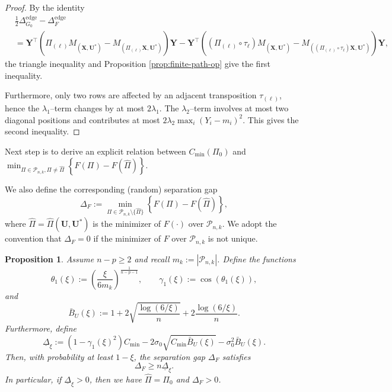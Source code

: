 \documentclass[11pt, reqno]{amsart}
\renewcommand{\hat}{\widehat}
\renewcommand{\ge}{\geqslant}
\newcommand{\mP}{\mathcal{P}}
\newcommand{\1}{\mbox{1}\hspace{-0.25em}\mbox{l}}
\theoremstyle{definition}\newtheorem{problem}{Problem}[section]
\theoremstyle{definition}\newtheorem{definition}[problem]{Definition}
\theoremstyle{remark}\newtheorem{assumption}{Assumption}
\theoremstyle{remark}\newtheorem{remark}[problem]{Remark}
\theoremstyle{definition}\newtheorem{example}[problem]{Example}
\theoremstyle{plain}\newtheorem{theorem}[problem]{Theorem}
\theoremstyle{plain}\newtheorem{question}[problem]{Question}
\theoremstyle{plain}\newtheorem{lemma}[problem]{Lemma}
\theoremstyle{plain}\newtheorem{proposition}[problem]{Proposition}
\theoremstyle{plain}\newtheorem{corollary}[problem]{Corollary}
\theoremstyle{plain}\newtheorem{conjecture}[problem]{Conjecture}
\begin{document}
\begin{proof}
By the identity
\begin{align}    
&\frac{1}{2}\Delta_{G_0}^{\mathrm{edge}}-\Delta_F^{\mathrm{edge}}\\
&=\bm Y^\top  \left(\Pi_{(\ell)}M_{(\bm X,\bm U^*)}-M_{(\Pi_{(\ell)}\bm X,\bm U^*)}\right)  \bm Y
-\bm Y^\top  \left( (\Pi_{(\ell)} \circ \tau_\ell) M_{(\bm X,\bm U^*)}-M_{((\Pi_{(\ell)} \circ \tau_\ell)\bm X,\bm U^*)}\right)  \bm Y, 
\end{align}
the triangle inequality and Proposition \ref{prop:finite-path-op} give the first inequality. 

Furthermore, only two rows are affected by an adjacent transposition $\tau_{(\ell)}$, hence the $\lambda_1$–term changes by at most $2\lambda_1$. The $\lambda_2$–term involves at most two diagonal positions and contributes at most $2\lambda_2\max_i (Y_i-m_i)^2$. This gives the second inequality.
\end{proof}

Next step is to derive an explicit relation between $C_{\min}(\Pi_0)$ and $\min_{\Pi\in\mP_{n,k}, \Pi\neq\hat\Pi}\left\{F(\Pi)-F(\hat\Pi)\right\}$.

We also define the corresponding (random) separation gap
\begin{equation}\label{eq:delta-F}
\Delta_F
:= \min_{\Pi\in\mP_{n,k}\setminus\{\hat\Pi\}}
\left\{F(\Pi)-F(\hat\Pi)\right\},
\end{equation}
where $\hat\Pi=\hat\Pi(\bm U,\bm U^*)$ is the minimizer of $F(\cdot)$ over $\mP_{n,k}$.
We adopt the convention that $\Delta_F=0$ if the minimizer of $F$ over $\mP_{n,k}$ is not unique.


\begin{proposition}\label{prop:F separation gap}
Assume $n-p \ge 2$ and recall $m_k := |\mP_{n,k}|$.
Define the functions
\begin{equation}\label{eq:theta1}
\theta_1(\xi) := \left(\frac{\xi}{6m_k}\right)^{\frac{1}{n-p-1}},
\qquad
\gamma_1(\xi) := \cos\left(\theta_1(\xi)\right),
\end{equation}
and
\begin{equation}\label{eq:bar-BU}
\bar B_U(\xi):=1+2\sqrt{\frac{\log(6/\xi)}{n}}+2\frac{\log(6/\xi)}{n}.
\end{equation}
Furthermore, define
\begin{equation}\label{eq:Delta-under-xi}
\underline\Delta_\xi :=
(1-\gamma_1(\xi)^2)C_{\min}
-2\sigma_0\sqrt{C_{\min}\bar B_U(\xi)}
-\sigma_0^2 \bar B_U(\xi).
\end{equation}
Then, with probability at least $1-\xi$, the separation gap $\Delta_F$ satisfies
\[
\Delta_F \ge n\underline\Delta_\xi.
\]
In particular, if $\underline\Delta_\xi>0$, then we have $\hat\Pi=\Pi_0$ and $\Delta_F>0$.
\end{proposition}
\end{document}

